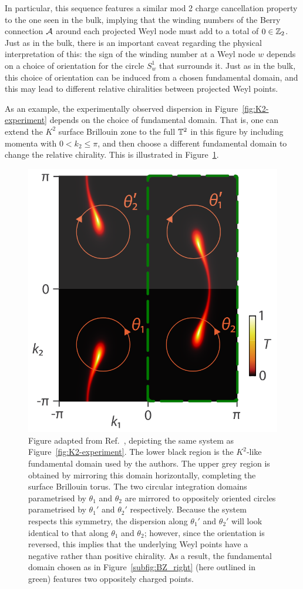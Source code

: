 In particular, this sequence features a similar mod 2 charge cancellation property to the one seen in the bulk, implying that the winding numbers of the Berry connection $\mathcal{A}$ around each projected Weyl node must add to a total of $0\in\mathbb{Z}_2$. Just as in the bulk, there is an important caveat regarding the physical interpretation of this: the sign of the winding number at a Weyl node $w$ depends on a choice of orientation for the circle $S_w^1$ that surrounds it. Just as in the bulk, this choice of orientation can be induced from a chosen fundamental domain, and this may lead to different relative chiralities between projected Weyl points.

As an example, the experimentally observed dispersion in Figure~\ref{fig:K2-experiment} depends on the choice of fundamental domain. That is, one can extend the $K^2$ surface Brillouin zone to the full $\mathbb{T}^2$ in this figure by including momenta with $0<k_2\leq\pi$, and then choose a different fundamental domain to change the relative chirality. This is illustrated in Figure~\ref{fig:K2-experiment-alt}.
\begin{figure}[htb!]
	\centering
	\includegraphics[width=.5\linewidth]{Images/K2-experiment-alt}
	\caption{Figure adapted from Ref.~\cite{Fonseca-Vaidya_nonorientable}, depicting the same system as Figure~\ref{fig:K2-experiment}. The lower black region is the $K^2$-like fundamental domain used by the authors. The upper grey region is obtained by mirroring this domain horizontally, completing the surface Brillouin torus. The two circular integration domains parametrised by $\theta_1$ and $\theta_2$ are mirrored to oppositely oriented circles parametrised by $\theta_1'$ and $\theta_2'$ respectively. Because the system respects this symmetry, the dispersion along $\theta_1'$ and $\theta_2'$ will look identical to that along $\theta_1$ and $\theta_2$; however, since the orientation is reversed, this implies that the underlying Weyl points have a negative rather than positive chirality. As a result, the fundamental domain chosen as in Figure~\ref{subfig:BZ_right} (here outlined in green) features two oppositely charged points.}
	\label{fig:K2-experiment-alt}
\end{figure}


